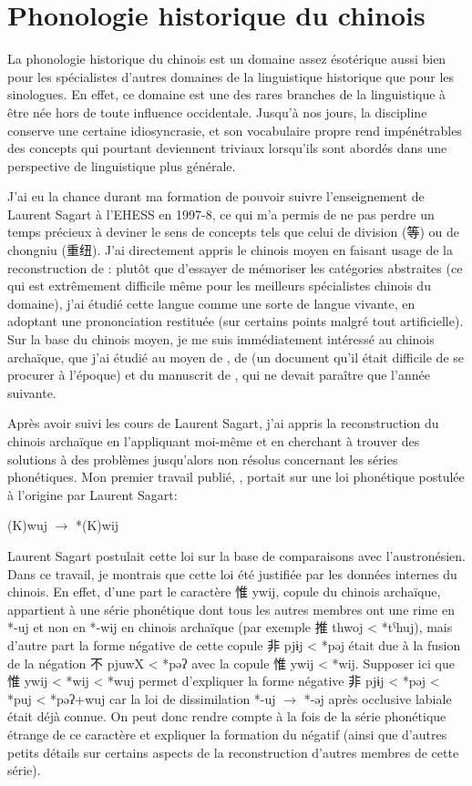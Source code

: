\documentclass[oldfontcommands,oneside,a4paper,11pt]{memoir}
\newcommand{\zh}[1]{{\cn #1}}
\begin{document}
\section{Phonologie historique du chinois}
La phonologie historique du chinois est un domaine assez ésotérique aussi bien pour les spécialistes d'autres domaines de la linguistique historique que pour les sinologues. En effet, ce domaine est une des rares branches de la linguistique à être née hors de toute influence occidentale. Jusqu'à nos jours, la discipline conserve une certaine idiosyncrasie, et son vocabulaire propre rend impénétrables des concepts qui pourtant deviennent triviaux lorsqu'ils sont abordés dans une perspective de linguistique plus générale. 

J'ai eu la chance durant ma formation de pouvoir suivre l'enseignement de Laurent Sagart à l'EHESS en 1997-8, ce qui m'a permis de ne pas perdre   un temps précieux à deviner le sens de concepts  
tels que celui de division (\zh{等}) ou de chongniu (\zh{重纽}). J'ai directement appris le chinois moyen en faisant usage de la reconstruction de \citet{baxter92}: plutôt que d'essayer de mémoriser les catégories abstraites (ce qui est extrêmement difficile même pour les meilleurs spécialistes chinois du domaine), j'ai étudié cette langue comme une sorte de langue vivante, en adoptant une prononciation restituée (sur certains points malgré tout artificielle). Sur la base du chinois moyen, je me suis immédiatement intéressé au chinois archaïque, que j'ai étudié au moyen de \citet{baxter92}, de \citet{starostin89} (un document qu'il était difficile de se procurer à l'époque) et du manuscrit de \citet{sagart99roc}, qui ne devait paraître que l'année suivante.

Après avoir suivi les cours de Laurent Sagart, j'ai appris la reconstruction du chinois archaïque en l'appliquant moi-même et en cherchant à trouver des solutions à des problèmes jusqu'alors non résolus concernant les séries phonétiques. Mon premier travail publié, \citet{jacques00ywij}, portait sur une loi phonétique postulée à l'origine par Laurent Sagart:
\begin{exe}
\ex 
\glt *(K)wuj $\rightarrow $ *(K)wij 
\end{exe}
Laurent Sagart postulait cette loi sur la base de comparaisons avec l'austronésien. Dans ce travail, je montrais que cette loi été justifiée par les données internes du chinois. En effet, d'une part le caractère \zh{惟} ywij, copule du chinois archaïque, appartient à une série phonétique dont tous les autres membres ont une rime en *-uj et non en *-wij en chinois archaïque (par exemple \zh{推} thwoj < *tˁhuj), mais d'autre part la forme négative de cette copule \zh{非} pjɨj < *pəj était due à la fusion de la négation \zh{不} pjuwX < *pəʔ avec la copule \zh{惟} ywij < *wij. Supposer ici que \zh{惟} ywij < *wij < *wuj permet d'expliquer la forme négative \zh{非} pjɨj < *pəj < *puj < *pəʔ+wuj car la loi de dissimilation *-uj $\rightarrow $ *-əj après occlusive labiale était déjà connue. On peut donc rendre compte à la fois de la série phonétique étrange de ce caractère et expliquer la formation du négatif (ainsi que d'autres petits détails sur certains aspects de la reconstruction  d'autres membres de cette série).
\end{document}
